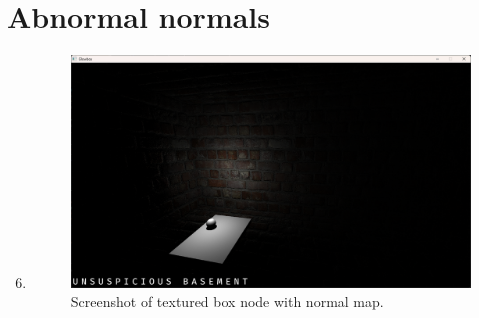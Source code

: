 \documentclass[11pt,a4paper]{report}
\begin{document}
\section{Abnormal normals}
\begin{enumerate}[label=(\alph*)]\setcounter{enumi}{5}
		\item \hfill
		
		\begin{figure}[h]
			\centering
			\includegraphics[width=\textwidth]{images/task3f.png}
			\caption{Screenshot of textured box node with normal map.}
		\end{figure}
		
\end{enumerate}
\end{document}
